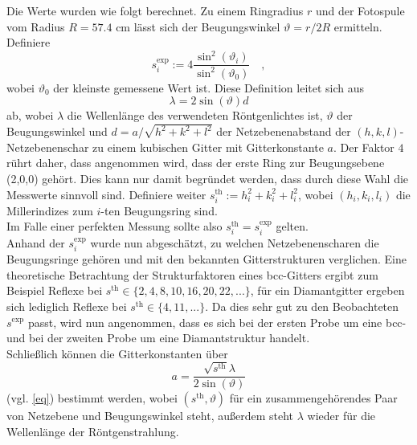 Die Werte wurden wie folgt berechnet. Zu einem Ringradius $r$ und der Fotospule vom 
Radius $R=57.4 \text{ cm}$ lässt sich der Beugungswinkel $\vartheta=r/2R$ ermitteln. 
Definiere
\begin{equation}
s_i^\text{exp}:=4 \frac{\sin^2(\vartheta_i)}{\sin^2(\vartheta_0)} \quad ,
\end{equation}
wobei $\vartheta_0$ der kleinste gemessene Wert ist. Diese Definition leitet sich 
aus
\begin{equation}
\lambda=2\sin(\vartheta) d \label{eq}
\end{equation}
ab, wobei $\lambda$ die Wellenlänge des verwendeten Röntgenlichtes ist, $\vartheta$ der Beugungswinkel und $d=a/\sqrt{h^2+k^2+l^2}$ der Netzebenenabstand der $(h,k,l)$-
Netzebenenschar zu einem kubischen Gitter mit Gitterkonstante $a$. Der Faktor $4$ rührt daher, dass angenommen wird, dass der erste Ring zur 
Beugungsebene (2,0,0) gehört. Dies kann nur damit begründet werden, dass durch diese
Wahl die Messwerte sinnvoll sind. 
Definiere weiter $s^\text{th}_i:=h_i^2+k_i^2+l_i^2$, wobei $(h_i,k_i,l_i)$ die 
Millerindizes zum $i$-ten Beugungsring sind.\\
Im Falle einer perfekten Messung sollte also $s_i^\text{th}=s_i^\text{exp}$ gelten.
\\
Anhand der $s_i^\text{exp}$ wurde nun abgeschätzt, zu welchen Netzebenenscharen die 
Beugungsringe gehören und mit den bekannten Gitterstrukturen verglichen. Eine 
theoretische Betrachtung der Strukturfaktoren eines bcc-Gitters ergibt zum Beispiel 
Reflexe bei $s^\text{th} \in \{ 2,4,8,10,16,20,22,... \}$, für ein Diamantgitter 
ergeben sich lediglich Reflexe bei $s^\text{th}\in \{ 4,11,... \}$. Da dies sehr gut 
zu den Beobachteten $s^\text{exp}$ passt, wird nun angenommen, dass es sich bei der 
ersten Probe um eine bcc- und bei der zweiten Probe um eine Diamantstruktur handelt.
\\
Schließlich können die Gitterkonstanten über
\begin{equation}
a=\frac{\sqrt{s^\text{th}} \lambda}{2 \sin(\vartheta)}
\end{equation}
(vgl. \eqref{eq}) bestimmt werden, wobei $(s^\text{th},\vartheta)$ für ein 
zusammengehörendes Paar von Netzebene und Beugungswinkel steht, außerdem steht 
$\lambda$ wieder für die Wellenlänge der Röntgenstrahlung.

